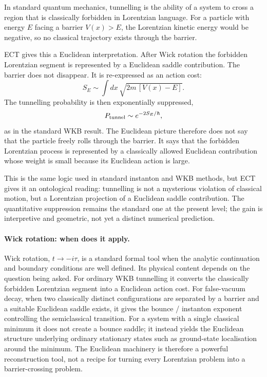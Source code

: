 \documentclass[11pt,a4paper]{article}
\begin{document}
In standard quantum mechanics, tunnelling is the ability of a system
to cross a region that is classically forbidden in Lorentzian language.
For a particle with energy $E$ facing a barrier $V(x)>E$, the
Lorentzian kinetic energy would be negative, so no classical
trajectory exists through the barrier.

ECT gives this a Euclidean interpretation. After Wick rotation the
forbidden Lorentzian segment is represented by a Euclidean saddle
contribution. The barrier does not disappear. It is re-expressed as
an action cost:
\[
  S_E \sim \int dx\,\sqrt{2m\,[V(x)-E]} .
\]
The tunnelling probability is then exponentially suppressed,
\[
  P_{\rm tunnel}\sim e^{-2S_E/\hbar},
\]
as in the standard WKB result. The Euclidean picture therefore does
not say that the particle freely rolls through the barrier. It says
that the forbidden Lorentzian process is represented by a classically
allowed Euclidean contribution whose weight is small because its
Euclidean action is large.

This is the same logic used in standard instanton and WKB methods,
but ECT gives it an ontological reading: tunnelling is not a
mysterious violation of classical motion, but a Lorentzian projection
of a Euclidean saddle contribution. The quantitative suppression
remains the standard one at the present level; the gain is
interpretive and geometric, not yet a distinct numerical prediction.

\paragraph{Wick rotation: when does it apply.}
Wick rotation, $t\to-i\tau$, is a standard formal tool when the
analytic continuation and boundary conditions are well defined. Its
physical content depends on the question being asked. For ordinary
WKB tunnelling it converts the classically forbidden Lorentzian segment
into a Euclidean action cost. For false-vacuum decay, when two
classically distinct configurations are separated by a barrier and a
suitable Euclidean saddle exists, it gives the bounce / instanton
exponent controlling the semiclassical transition. For a system with a
single classical minimum it does not create a bounce saddle; it instead
yields the Euclidean structure underlying ordinary stationary states
such as ground-state localisation around the minimum. The Euclidean
machinery is therefore a powerful reconstruction tool, not a recipe for
turning every Lorentzian problem into a barrier-crossing problem.
\end{document}
